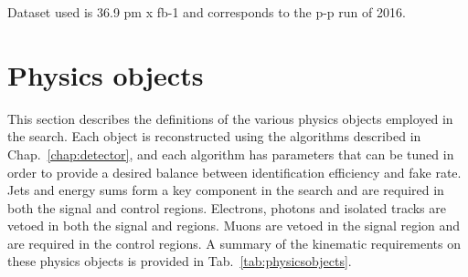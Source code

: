 Dataset used is 36.9 pm x fb-1 and corresponds to the p-p run of 2016.

\section{Physics objects}
\label{sec:analysis-physicsobjects}

This section describes the definitions of the various physics objects employed 
in the search. Each object is reconstructed using the algorithms described in 
Chap.~\ref{chap:detector}, and each algorithm has parameters that can be tuned 
in order to provide a desired balance between identification efficiency and 
fake rate. Jets and energy sums form a key component in the search and are 
required in both the signal and control regions. Electrons, photons and 
isolated tracks are vetoed in both the signal and regions. Muons are vetoed in 
the signal region and are required in the control regions. A summary of the 
kinematic requirements on these physics objects is provided in 
Tab.~\ref{tab:physicsobjects}.

